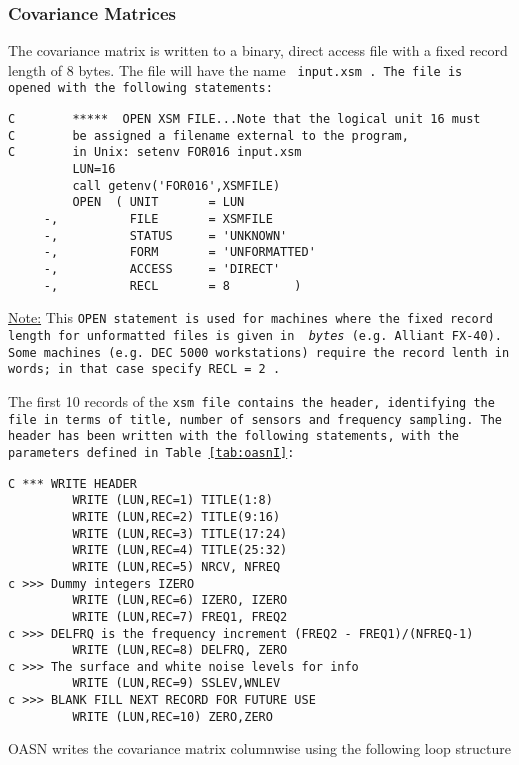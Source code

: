 \subsubsection{Covariance Matrices}
\label{sec:cova}

The covariance matrix is written to a binary, direct access file with
a fixed record length of 8 bytes. The file will have the name \tt
input.xsm \rm. The file is opened with the
following statements:

\small
\begin{verbatim}
C        *****  OPEN XSM FILE...Note that the logical unit 16 must 
C        be assigned a filename external to the program, 
C        in Unix: setenv FOR016 input.xsm
         LUN=16
         call getenv('FOR016',XSMFILE)
         OPEN  ( UNIT       = LUN
     -,          FILE       = XSMFILE
     -,          STATUS     = 'UNKNOWN'
     -,          FORM       = 'UNFORMATTED'
     -,          ACCESS     = 'DIRECT'
     -,          RECL       = 8         )
\end{verbatim}
\normalsize

\noindent \underline{Note:} This \tt OPEN \rm statement is used for machines
where the fixed record length for unformatted files is given in {\em
bytes} (e.g. Alliant FX-40). 
Some machines (e.g. DEC 5000 workstations) require the record lenth
in words; in that case specify \tt RECL = 2 \rm.

The first 10 records of the \tt xsm \rm file contains the header,
identifying the file in terms of title, number of sensors and
frequency sampling. The header has been written with the following
statements, with the parameters defined in Table~\ref{tab:oasnI}:

\small
\begin{verbatim}
C *** WRITE HEADER
         WRITE (LUN,REC=1) TITLE(1:8)
         WRITE (LUN,REC=2) TITLE(9:16)
         WRITE (LUN,REC=3) TITLE(17:24)
         WRITE (LUN,REC=4) TITLE(25:32)
         WRITE (LUN,REC=5) NRCV, NFREQ
c >>> Dummy integers IZERO
         WRITE (LUN,REC=6) IZERO, IZERO
         WRITE (LUN,REC=7) FREQ1, FREQ2
c >>> DELFRQ is the frequency increment (FREQ2 - FREQ1)/(NFREQ-1)
         WRITE (LUN,REC=8) DELFRQ, ZERO
c >>> The surface and white noise levels for info
         WRITE (LUN,REC=9) SSLEV,WNLEV
c >>> BLANK FILL NEXT RECORD FOR FUTURE USE
         WRITE (LUN,REC=10) ZERO,ZERO
\end{verbatim}
\normalsize

OASN writes the covariance matrix columnwise using the following
loop structure  

